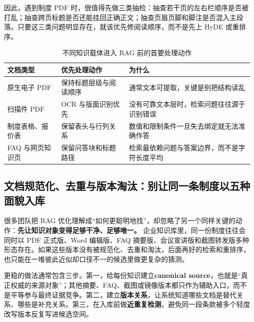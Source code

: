 因此，遇到制度 PDF 时，很值得先做三类抽检：抽查若干页的左右栏顺序是否被打乱；抽查跨页标题是否还能挂回正确正文；抽查页眉页脚和脚注是否混入主段落。只要这三类问题明显存在，就该优先修阅读顺序，而不是先上 HyDE 或重排序。

\begin{table}[H]
\centering
\small
\begin{tabularx}{\textwidth}{>{\raggedright\arraybackslash}p{2.7cm}>{\raggedright\arraybackslash}p{3cm}>{\raggedright\arraybackslash}X}
\toprule
\textbf{文档类型} & \textbf{优先处理动作} & \textbf{为什么} \\
\midrule
原生电子 PDF & 保持标题层级与阅读顺序 & 通常文本可提取，关键是别把结构读乱 \\
扫描件 PDF & OCR 与版面识别优先 & 没有可靠文本层时，检索问题往往源于识别错误 \\
制度表格、报价表 & 保留表头与行列关系 & 数值和限制条件一旦失去绑定就无法准确作答 \\
FAQ 与网页知识页 & 保留问答块和标题路径 & 检索最依赖问题与答案边界，而不是字符长度平均 \\
\bottomrule
\end{tabularx}
\caption{不同知识载体进入 RAG 前的首要处理动作}
\label{tab:rag-doc-first-action}
\end{table}

\subsection{文档规范化、去重与版本淘汰：别让同一条制度以五种面貌入库}
很多团队把 RAG 优化理解成“如何更聪明地找”，却忽略了另一个同样关键的动作：\textbf{先让知识对象变得足够干净、足够唯一。} 企业知识库里，同一份制度往往会同时以 PDF 正式版、Word 编辑版、FAQ 摘要版、会议宣讲版和截图转发版多种形态存在。如果这些版本没有被规范化、去重和淘汰，后面再好的检索和重排序，也只能在一堆彼此近似却口径不一的候选里做更复杂的猜测。

更稳的做法通常包含三步。第一，给每份知识建立\textbf{canonical source}，也就是“真正权威的来源对象”；其他摘要、FAQ、截图或镜像版本都只作为辅助入口，而不是平等参与最终证据竞争。第二，建立\textbf{版本关系}，让系统知道哪些文档是替代关系、哪些是补充关系。第三，在入库前做\textbf{近重复检测}，避免同一段条款被多个轻度改写版本反复写进候选空间。

